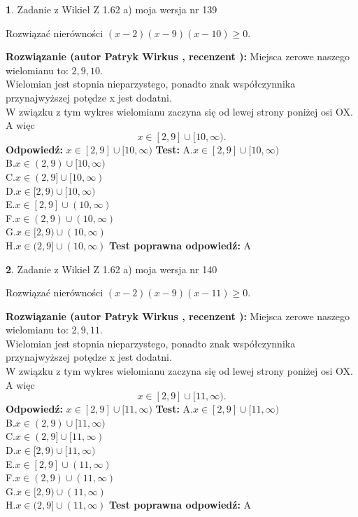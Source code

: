 \documentclass[12pt, a4paper]{article}
\theoremstyle{definition} %
\newtheorem{zad}{}
\newcommand{\zadStart}[1]{\begin{zad}#1\newline}
\newcommand{\zadStop}{\end{zad}}
\newcommand{\rozwStart}[2]{\noindent \textbf{Rozwiązanie (autor #1 , recenzent #2): }\newline}
\newcommand{\rozwStop}{\newline}
\newcommand{\odpStart}{\noindent \textbf{Odpowiedź:}\newline}
\newcommand{\odpStop}{\newline}
\newcommand{\testStart}{\noindent \textbf{Test:}\newline}
\newcommand{\testStop}{\newline}
\newcommand{\kluczStart}{\noindent \textbf{Test poprawna odpowiedź:}\newline}
\newcommand{\kluczStop}{\newline}
\begin{document}
\zadStart{Zadanie z Wikieł Z 1.62 a) moja wersja nr 139}

Rozwiązać nierówności $(x-2)(x-9)(x-10)\ge0$.
\zadStop
\rozwStart{Patryk Wirkus}{}
Miejsca zerowe naszego wielomianu to: $2, 9, 10$.\\
Wielomian jest stopnia nieparzystego, ponadto znak współczynnika przy\linebreak najwyższej potędze x jest dodatni.\\ W związku z tym wykres wielomianu zaczyna się od lewej strony poniżej osi OX. A więc $$x \in [2,9] \cup [10,\infty).$$
\rozwStop
\odpStart
$x \in [2,9] \cup [10,\infty)$
\odpStop
\testStart
A.$x \in [2,9] \cup [10,\infty)$\\
B.$x \in (2,9) \cup [10,\infty)$\\
C.$x \in (2,9] \cup [10,\infty)$\\
D.$x \in [2,9) \cup [10,\infty)$\\
E.$x \in [2,9] \cup (10,\infty)$\\
F.$x \in (2,9) \cup (10,\infty)$\\
G.$x \in [2,9) \cup (10,\infty)$\\
H.$x \in (2,9] \cup (10,\infty)$
\testStop
\kluczStart
A
\kluczStop



\zadStart{Zadanie z Wikieł Z 1.62 a) moja wersja nr 140}

Rozwiązać nierówności $(x-2)(x-9)(x-11)\ge0$.
\zadStop
\rozwStart{Patryk Wirkus}{}
Miejsca zerowe naszego wielomianu to: $2, 9, 11$.\\
Wielomian jest stopnia nieparzystego, ponadto znak współczynnika przy\linebreak najwyższej potędze x jest dodatni.\\ W związku z tym wykres wielomianu zaczyna się od lewej strony poniżej osi OX. A więc $$x \in [2,9] \cup [11,\infty).$$
\rozwStop
\odpStart
$x \in [2,9] \cup [11,\infty)$
\odpStop
\testStart
A.$x \in [2,9] \cup [11,\infty)$\\
B.$x \in (2,9) \cup [11,\infty)$\\
C.$x \in (2,9] \cup [11,\infty)$\\
D.$x \in [2,9) \cup [11,\infty)$\\
E.$x \in [2,9] \cup (11,\infty)$\\
F.$x \in (2,9) \cup (11,\infty)$\\
G.$x \in [2,9) \cup (11,\infty)$\\
H.$x \in (2,9] \cup (11,\infty)$
\testStop
\kluczStart
A
\kluczStop
\end{document}
